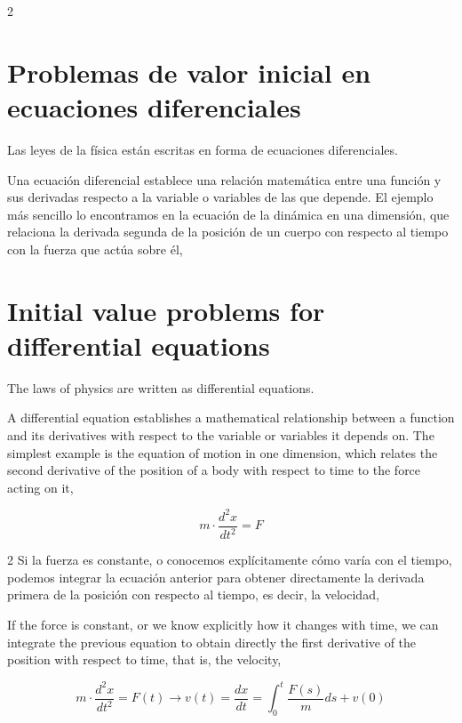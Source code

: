 \begin{paracol}{2}
\section{Problemas de valor inicial en ecuaciones diferenciales}
Las leyes de la física están escritas en forma de ecuaciones diferenciales.  

Una ecuación diferencial establece una relación matemática entre una función y sus derivadas respecto a la variable o variables de las que depende. El ejemplo más sencillo lo encontramos en la ecuación de la dinámica en una dimensión, que relaciona la derivada segunda de la posición de un cuerpo con respecto al tiempo con la fuerza que actúa sobre él,
\switchcolumn
\section{Initial value problems for differential equations}
The laws of physics are written as differential equations. 

A differential equation establishes a mathematical relationship between a function and its derivatives with respect to the variable or variables it depends on. The simplest example is the equation of motion in one dimension, which relates the second derivative of the position of a body with respect to time to the force acting on it,
\end{paracol}
\begin{equation*}
m\cdot \frac{d^2x}{dt^2}=F
\end{equation*}
\begin{paracol}{2}
Si la fuerza es constante, o conocemos explícitamente cómo varía con el tiempo, podemos integrar la ecuación anterior para obtener directamente la derivada primera de la posición con respecto al tiempo, es decir, la velocidad,

\switchcolumn
If the force is constant, or we know explicitly how it changes with time, we can integrate the previous equation to obtain directly the first derivative of the position with respect to time, that is, the velocity,
\end{paracol}
\begin{equation*}
m\cdot \frac{d^2x}{dt^2}=F(t) \rightarrow v(t)=\frac{dx}{dt}=\int_0^t \frac{F(s)}{m}ds +v(0)
\end{equation*}
